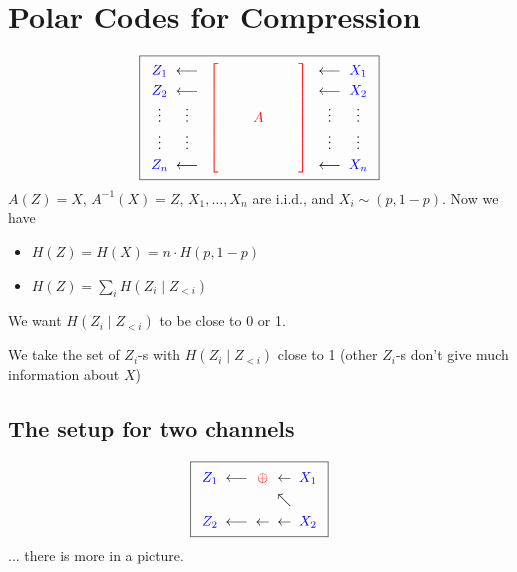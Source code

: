 \documentclass{article}
\begin{document}
\section{Polar Codes for Compression}
\[
\boxed{
\renewcommand{\arraystretch}{1.2}
\begin{array}{c@{\;\;}c}
{\color{blue}Z_1} & \longleftarrow \\
{\color{blue}Z_2} & \longleftarrow \\
\vdots & \vdots \\
\vdots & \vdots \\
{\color{blue}Z_n} & \longleftarrow
\end{array}
\;
{\color{red}\left[
\begin{array}{c}
\vphantom{X_1} \\
\vphantom{X_2} \\
\qquad A \qquad \vphantom{\vdots} \\
\vphantom{\vdots} \\
\vphantom{X_n}
\end{array}
\right]}
\;
\begin{array}{c@{\;\;}c}
\longleftarrow & {\color{blue}X_1} \\
\longleftarrow & {\color{blue}X_2} \\
\vdots & \vdots \\
\vdots & \vdots \\
\longleftarrow & {\color{blue}X_n}
\end{array}
}
\]
$A(Z) = X$, $A^{-1}(X)=Z$, $X_1,\ldots, X_n$ are i.i.d., and $X_i\sim (p,1-p)$. Now we have 
\begin{itemize}
    \item $H(Z) = H(X) = n\cdot H(p,1-p)$
    \item $H(Z)= \sum_i H(Z_i\mid Z_{<i})$
\end{itemize}
We want $H(Z_i\mid Z_{<i})$ to be close to 0 or 1.

We take the set of $Z_i$-s with $H(Z_i\mid Z_{<i})$ close to 1 (other $Z_i$-s don't give much information about $X$)

\subsection{The setup for two channels}
\[
\boxed{
\renewcommand{\arraystretch}{1.3}
\begin{array}{c@{\;\;}c@{\;\;}c@{\;\;}c@{\;\;}c}
{\color{blue}Z_1} & \longleftarrow & {\color{red}\oplus} & \leftarrow & {\color{blue}X_1} \\
 & & & \nwarrow & \\
{\color{blue}Z_2} & \longleftarrow & \leftarrow & \leftarrow & {\color{blue}X_2}
\end{array}
}
\]
... there is more in a picture.
\end{document}
